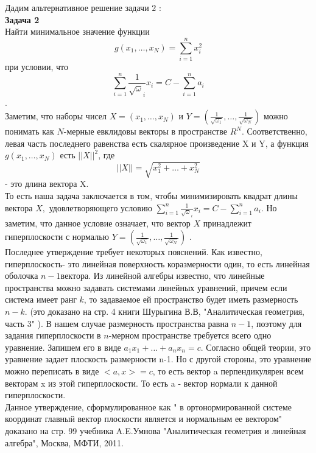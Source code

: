 \documentclass[12pt,a4paper]{article}
\begin{document}
Дадим альтернативное решение задачи $2$ :\\



{\bf Задача 2 }\\Найти минимальное значение функции $$g(x_1, \ldots, x_N)= \sum \limits_{i=1}^{n} x_i^2 $$ при условии, что 
$$\sum \limits_{i=1}^{n} \frac{1}{\sqrt \omega_i} x_i = C - \sum \limits_{i=1}^{n} a_i $$.\\

Заметим, что наборы чисел $X=(x_1, \ldots, x_N)$ и $Y=(\frac{1}{\sqrt {\omega_1} }, \ldots, \frac{1}{\sqrt {\omega_N}} )$ можно понимать как  $N$-мерные евклидовы векторы в пространстве $R^N$. Соответственно, левая часть  последнего равенства есть скалярное произведение X и Y, а функция $g(x_1, \ldots, x_N)$ есть $||X||^2$, где $$||X||= \sqrt{x_1^2+
\ldots+x_N^2}$$ - это длина вектора X.\\

То есть наша задача заключается в том, чтобы  минимизировать квадрат длины вектора $X, $ удовлетворяющего условию 
$\sum \limits_{i=1}^{n} \frac{1}{\sqrt \omega_i} x_i = C - \sum \limits_{i=1}^{n} a_i $. Но заметим, что данное условие означает, что вектор $X$ принадлежит гиперплоскости с нормалью $Y=(\frac{1}{\sqrt {\omega_1} }, \ldots, \frac{1}{\sqrt {\omega_N}} )$ .\\

Последнее утверждение требует некоторых пояснений. Как известно, гиперплоскость- это линейная поверхность коразмерности один, то есть линейная оболочка $ n-1 $вектора.  Из линейной алгебры известно, что линейные пространства можно задавать системами линейных уравнений, причем если система имеет ранг $ k$, то задаваемое ей пространство будет иметь размерность $n-k$.  (это доказано на стр. 4  книги Шурыгина В.В, "Аналитическая геометрия, часть 3" ). В нашем случае размерность пространства равна $n-1$, поэтому для задания  гиперплоскости в $n$-мерном пространстве  требуется всего одно уравнение. Запишем его в виде $a_1x_1 + \dots + a_nx_n=c$. Согласно общей теории, это уравнение задает плоскость размерности n-1. Но с другой стороны, это уравнение можно переписать в виде  $ <a,x> =c$, то есть вектор a перпендикулярен всем векторам x из этой гиперплоскости.  То есть a - вектор нормали к данной гиперплоскости.\\

Данное утверждение, сформулированное как  " в ортонормированной  системе координат главный вектор плоскости является и нормальным ее вектором" доказано на стр. 99  учебника A.E.Умнова "Аналитическая геометрия и линейная алгебра", Москва, МФТИ, 2011.\\
\end{document}
